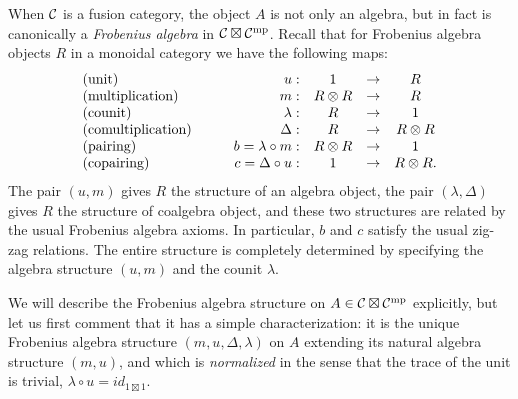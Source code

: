 \documentclass{amsart}
\begin{document}
When $\mathcal C$ is a fusion category, the object $A$ is not only an algebra, but in fact is canonically a {\em Frobenius algebra} in $\mathcal C \boxtimes \mathcal C^{\mathrm{mp}}$. Recall that for Frobenius algebra objects $R$ in a monoidal category we have the following maps:
\begin{equation*}
	\begin{array}{l c  r c c c}
		\textrm{(unit)} & \quad & u: & 1 & \to & R \\
		\textrm{(multiplication)} && m: & R \otimes R & \to & R \\
		\textrm{(counit)} && \lambda: & R &\to &1 \\
		\textrm{(comultiplication)} && \Delta: & R &\to& R \otimes R \\
		\textrm{(pairing)} && b = \lambda \circ m: & R \otimes R& \to& 1 \\
		\textrm{(copairing)} && c = \Delta \circ u: & 1&\to&  R \otimes R.
	\end{array}
\end{equation*}
The pair $(u,m)$ gives $R$ the structure of an algebra object, the pair $(\lambda, \Delta)$ gives $R$ the structure of coalgebra object, and these two structures are related by the usual Frobenius algebra axioms.  In particular, $b$ and $c$ satisfy the usual zig-zag relations. The entire structure is completely determined by specifying the algebra structure $(u,m)$ and the counit $\lambda$.

We will describe the Frobenius algebra structure on $A \in \mathcal C \boxtimes \mathcal C^{\mathrm{mp}}$ explicitly, but let us first comment that it has a simple characterization: it is the unique Frobenius algebra structure $(m, u, \Delta, \lambda)$ on $A$ extending its natural algebra structure $(m,u)$, and which is {\em normalized} in the sense that the trace of the unit is trivial, $\lambda \circ u = id_{1 \boxtimes 1}$.
\end{document}
